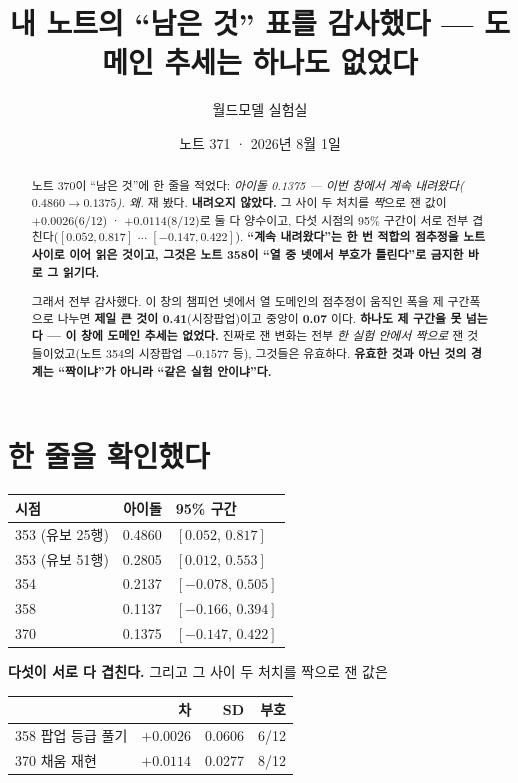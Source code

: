 \documentclass[11pt]{article}
\begin{document}
\title{내 노트의 ``남은 것'' 표를 감사했다 --- 도메인 추세는 하나도 없었다}
\author{월드모델 실험실}
\date{노트 371 · 2026년 8월 1일}
\maketitle

\begin{abstract}
노트 370이 ``남은 것''에 한 줄을 적었다: \emph{아이돌 0.1375 --- 이번
창에서 계속 내려왔다($0.4860 \to 0.1375$). 왜.} 재 봤다. \textbf{내려오지
않았다.} 그 사이 두 처치를 \emph{짝}으로 잰 값이 $+0.0026$(6/12) ·
$+0.0114$(8/12)로 둘 다 양수이고, 다섯 시점의 95\% 구간이 서로 전부
겹친다($[0.052,0.817]$ $\cdots$ $[-0.147,0.422]$). \textbf{``계속
내려왔다''는 한 번 적합의 점추정을 노트 사이로 이어 읽은 것이고, 그것은
노트 358이 ``열 중 넷에서 부호가 틀린다''로 금지한 바로 그 읽기다.}

그래서 전부 감사했다. 이 창의 챔피언 넷에서 열 도메인의 점추정이 움직인
폭을 제 구간폭으로 나누면 \textbf{제일 큰 것이 0.41}(시장팝업)이고 중앙이
\textbf{0.07} 이다. \textbf{하나도 제 구간을 못 넘는다 --- 이 창에 도메인
추세는 없었다.} 진짜로 잰 변화는 전부 \emph{한 실험 안에서 짝으로} 잰
것들이었고(노트 354의 시장팝업 $-0.1577$ 등), 그것들은 유효하다.
\textbf{유효한 것과 아닌 것의 경계는 ``짝이냐''가 아니라 ``같은 실험
안이냐''다.}
\end{abstract}

\section{한 줄을 확인했다}

\begin{center}
\begin{tabular}{lrl}
\hline
시점 & 아이돌 & 95\% 구간 \\
\hline
353 (유보 25행) & 0.4860 & $[0.052,\,0.817]$ \\
353 (유보 51행) & 0.2805 & $[0.012,\,0.553]$ \\
354 & 0.2137 & $[-0.078,\,0.505]$ \\
358 & 0.1137 & $[-0.166,\,0.394]$ \\
370 & 0.1375 & $[-0.147,\,0.422]$ \\
\hline
\end{tabular}
\end{center}

\textbf{다섯이 서로 다 겹친다.} 그리고 그 사이 두 처치를 짝으로 잰 값은

\begin{center}
\begin{tabular}{lrrr}
\hline
 & 차 & SD & 부호 \\
\hline
358 팝업 등급 풀기 & $+0.0026$ & 0.0606 & 6/12 \\
370 채움 재현 & $+0.0114$ & 0.0277 & 8/12 \\
\hline
\end{tabular}
\end{center}
\end{document}
